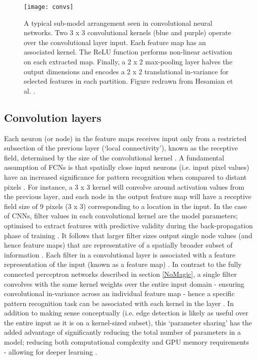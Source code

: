 \begin{figure}[H]
	\begin{center}
		\texttt{[image: convs]}
		\caption{A typical sub-model arrangement seen in convolutional neural networks. Two 3 x 3 convolutional kernels (blue and purple) operate over the convolutional layer input. Each feature map has an associated kernel. The ReLU function performs non-linear activation on each extracted map. Finally, a 2 x 2 max-pooling layer halves the output dimensions and encodes a 2 x 2 translational in-variance for selected features in each partition. Figure redrawn from Hesamian et al. \cite{Hesamian2019}.}
		\label{fig:convs}
	\end{center}
\end{figure}

\subsection{Convolution layers}
Each neuron (or node) in the feature maps receives input only from a restricted subsection of the previous layer (`local connectivity'), known as the receptive field, determined by the size of the convolutional kernel \cite{Hesamian2019}. A fundamental assumption of FCNs is that spatially close input neurons (i.e. input pixel values) have an increased significance for pattern recognition when compared to distant pixels \cite{Hu2015}. For instance, a 3 x 3 kernel will convolve around activation values from the previous layer, and each node in the output feature map will have a receptive field size of 9 pixels (3 x 3) corresponding to a location in the input. In the case of CNNs, filter values in each convolutional kernel are the model parameters; optimised to extract features with predictive validity during the back-propagation phase of training \cite{Maier2019}. It follows that larger filter sizes output single node values (and hence feature maps) that are representative of a spatially broader subset of information \cite{Nemoto_2020}. Each filter in a convolutional layer is associated with a feature representation of the input (known as a feature map) \cite{Hesamian2019}. In contrast to the fully connected perceptron networks described in section \ref{NoMagic}, a single filter convolves with the same kernel weights over the entire input domain - ensuring convolutional in-variance across an individual feature map \cite{Maier2019} - hence a specific pattern recognition task can be associated with each kernel in the layer \cite{Zeiler_2014}. In addition to making sense conceptually (i.e. edge detection is likely as useful over the entire input as it is on a kernel-sized subset), this `parameter sharing' has the added advantage of significantly reducing the total number of parameters in a model; reducing both computational complexity and GPU memory requirements - allowing for deeper learning \cite{Lundervold2019}.

